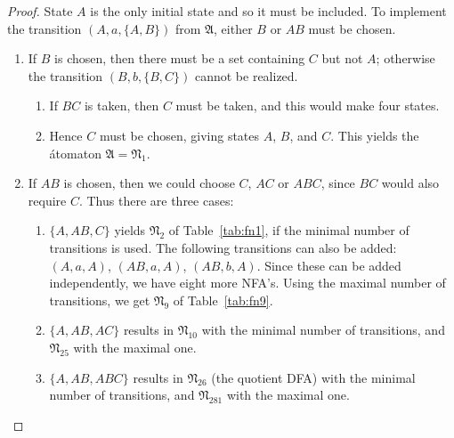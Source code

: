 \documentclass{llncs}
\newcommand{\be}{\begin{enumerate}}
\newcommand{\ee}{\end{enumerate}}
\newcommand{\fA}{{\mathfrak A}}
\newcommand{\fN}{{\mathfrak N}}
\begin{document}
\begin{example}
\begin{proof}
State $A$ is the only initial state and so it must be included.
To implement the transition
$(A,a,\{A,B\})$ from $\fA$,
either $B$ or $AB$ must be chosen. 
\be
\item
If $B$ is chosen, then there must be a set containing $C$ but not $A$; otherwise 
the transition 
 $(B,b,\{B,C\})$ cannot be realized.
        \be
        \item
        If $BC$ is taken, then $C$ must be taken, and this would make four states.
        \item
         Hence $C$ must be chosen, giving states $A$, $B$, and $C$.
         This yields the \'atomaton $\fA=\fN_1$.
         \ee
\item
If $AB$ is chosen, then we could choose $C$, $AC$ or $ABC$, since $BC$ would also require
 $C$. Thus there are three cases:
        \be
        \item
        $\{A,AB,C\}$ yields $\fN_2$ of Table~\ref{tab:fn1}, if the minimal number of 
        transitions is used. 
        The following transitions can also be added: $(A,a,A)$, $(AB,a,A)$, $(AB,b,A)$.
        Since these can be added independently, we have eight more NFA's. 
        Using the maximal number of transitions, we get $\fN_9$ of Table~\ref{tab:fn9}.
        \item
        $\{A,AB,AC\}$ results in $\fN_{10}$ with the minimal number of transitions, and 
        $\fN_{25}$ with the maximal one.
        \item
        $\{A,AB,ABC\}$ results in $\fN_{26}$ (the quotient DFA) with the minimal number 
of transitions, and  $\fN_{281}$ with the maximal one.
        \ee
\ee



\end{proof}
\end{example}
\end{document}
